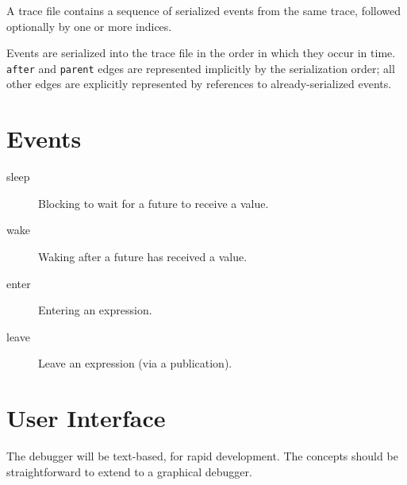 \documentclass{article}[12pt]
\begin{document}
A trace file contains a sequence of serialized events from the same trace,
followed optionally by one or more indices.

Events are serialized into the trace file in the order in which they occur in
time.  \texttt{after} and \texttt{parent} edges are represented implicitly by
the serialization order; all other edges are explicitly represented by
references to already-serialized events.

\section{Events}

\begin{description}
\item[sleep] Blocking to wait for a future to receive a value.
\item[wake] Waking after a future has received a value.
\item[enter] Entering an expression.
\item[leave] Leave an expression (via a publication).
\end{description}

\section{User Interface}

The debugger will be text-based, for rapid development. The concepts should be straightforward
to extend to a graphical debugger.
\end{document}
